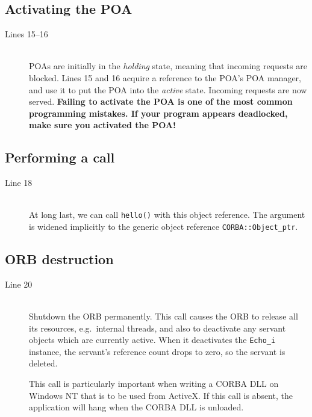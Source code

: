\documentclass[11pt,twoside,a4paper]{book}
\newcommand{\type}[1]{\texttt{#1}}
\newcommand{\op}[1]{\texttt{#1()}}
\newcommand{\term}[1]{\textit{#1}}
\begin{document}
\subsection{Activating the POA}

\begin{description}

\item[Lines 15--16]\mbox{}\\
%
POAs are initially in the \term{holding} state, meaning that incoming
requests are blocked. Lines 15 and 16 acquire a reference to the POA's
POA manager, and use it to put the POA into the \term{active} state.
Incoming requests are now served. \textbf{Failing to activate the POA
is one of the most common programming mistakes. If your program
appears deadlocked, make sure you activated the POA!}

\end{description}


\subsection{Performing a call}

\begin{description}

\item[Line 18]\mbox{}\\
%
At long last, we can call \op{hello} with this object reference. The
argument is widened implicitly to the generic object reference
\type{CORBA::Object\_ptr}.

\end{description}


\subsection{ORB destruction}

\begin{description}

\item[Line 20]\mbox{}\\
%
Shutdown the ORB permanently. This call causes the ORB to release all
its resources, e.g.\ internal threads, and also to deactivate any
servant objects which are currently active. When it deactivates the
\type{Echo\_i} instance, the servant's reference count drops to zero,
so the servant is deleted.

This call is particularly important when writing a CORBA DLL on
Windows NT that is to be used from ActiveX. If this call is absent,
the application will hang when the CORBA DLL is unloaded.

\end{description}
\end{document}
